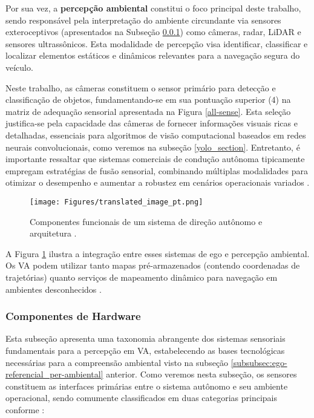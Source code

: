 Por sua vez, a \textbf{percepção ambiental} constitui o foco principal deste trabalho, sendo responsável pela interpretação do ambiente circundante via sensores exteroceptivos (apresentados na Subseção \ref{sensor}) como câmeras, radar, LiDAR e sensores ultrassônicos. Esta modalidade de percepção visa identificar, classificar e localizar elementos estáticos e dinâmicos relevantes para a navegação segura do veículo.

Neste trabalho, as câmeras constituem o sensor primário para detecção e classificação de objetos, fundamentando-se em sua pontuação superior (4) na matriz de adequação sensorial apresentada na Figura \ref{all-sense}. Esta seleção justifica-se pela capacidade das câmeras de fornecer informações visuais ricas e detalhadas, essenciais para algoritmos de visão computacional baseados em redes neurais convolucionais, como veremos na subseção \ref{yolo_section}. Entretanto, é importante ressaltar que sistemas comerciais de condução autônoma tipicamente empregam estratégias de fusão sensorial, combinando múltiplas modalidades para otimizar o desempenho e aumentar a robustez em cenários operacionais variados \cite[p. ~9]{zheng2023simultaneous}.

\begin{figure}[H]
\centering
\texttt{[image: Figures/translated\_image\_pt.png]}
\caption{Componentes funcionais de um sistema de direção autônomo e arquitetura \cite[p. ~2]{zheng2023simultaneous}.}
\label{componentes-funcionais}
\end{figure}


A Figura \ref{componentes-funcionais} ilustra a integração entre esses sistemas de ego e percepção ambiental. Os VA podem utilizar tanto mapas pré-armazenados (contendo coordenadas de trajetórias) quanto serviços de mapeamento dinâmico para navegação em ambientes desconhecidos \cite[p. ~2]{zheng2023simultaneous}.

\subsubsection{Componentes de Hardware} \label{sensor}

Esta subseção apresenta uma taxonomia abrangente dos sistemas sensoriais fundamentais para a percepção em VA, estabelecendo as bases tecnológicas necessárias para a compreensão ambiental visto na subseção \ref{subsubsec:ego-referencial_per-ambiental} anterior. Como veremos nesta subseção, os sensores constituem as interfaces primárias entre o sistema autônomo e seu ambiente operacional, sendo comumente classificados em duas categorias principais conforme :

